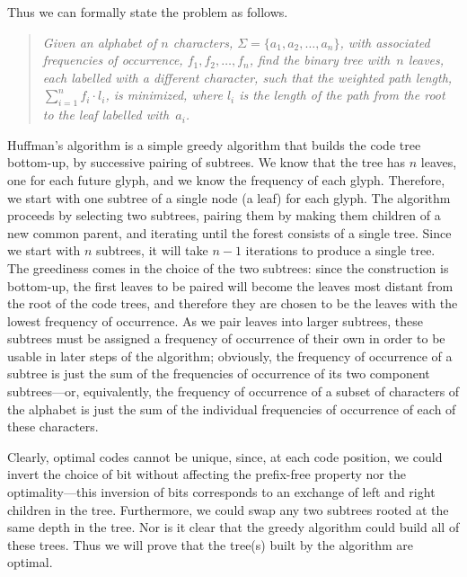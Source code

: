 \documentclass[11pt]{article}
\begin{document}
Thus we can formally state the problem as follows.
\begin{quote}
  \it
  Given an alphabet of $n$ characters, $\Sigma = \{a_1,a_2,\ldots,a_n\}$, with
  associated frequencies of occurrence, $f_1,f_2,\ldots,f_n$, find the binary
  tree with~$n$ leaves, each labelled with a different character, such that the
  weighted path length, $\sum_{i=1}^n f_i \cdot l_i$, is minimized, where $l_i$
  is the length of the path from the root to the leaf labelled with~$a_i$.
\end{quote}
Huffman's algorithm is a simple greedy algorithm that builds the code
tree bottom-up, by successive pairing of subtrees.  We know that the tree
has $n$ leaves, one for each future glyph, and we know the frequency of each
glyph.  Therefore, we start with one subtree of a single node (a leaf)
for each glyph.  The algorithm proceeds by selecting two subtrees, pairing
them by making them children of a new common parent, and iterating until
the forest consists of a single tree.  Since we start with $n$ subtrees,
it will take $n-1$ iterations to produce a single tree.
The greediness comes in the choice
of the two subtrees: since the construction is bottom-up, the first leaves
to be paired will become the leaves most distant from the root of the code
trees, and therefore they are chosen to be the leaves with the lowest frequency
of occurrence.  As we pair leaves into larger subtrees, these subtrees must
be assigned a frequency of occurrence of their own in order to be usable in
later steps of the algorithm; obviously, the frequency of occurrence of a
subtree is just the sum of the frequencies of occurrence of its two
component subtrees---or, equivalently, the frequency of occurrence of a subset
of characters of the alphabet is just the sum of the individual frequencies of
occurrence of each of these characters.

Clearly, optimal codes cannot be unique, since, at each code position,
we could invert the choice of bit without affecting the prefix-free
property nor the optimality---this inversion of bits corresponds to
an exchange of left and right children in the tree.  Furthermore, we could
swap any two subtrees rooted at the same depth in the tree.  Nor is it
clear that the greedy algorithm could build all of these trees.  Thus
we will prove that the tree(s) built by the algorithm are optimal.
\end{document}
